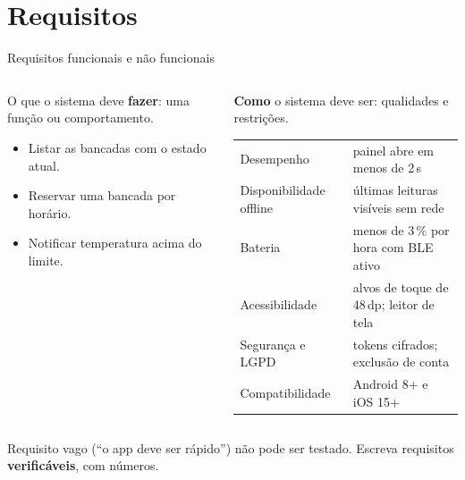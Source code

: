 \documentclass[aspectratio=169,10pt]{beamer}
\begin{document}
\section{Requisitos}

\begin{frame}{Requisitos funcionais e não funcionais}
  \begin{columns}[T]
    \begin{column}{0.48\textwidth}
      \begin{definicao}
        O que o sistema deve \textbf{fazer}: uma função ou comportamento.
      \end{definicao}
      \begin{exemplo}[No LabMonitor]
        \begin{itemize}
          \item Listar as bancadas com o estado atual.
          \item Reservar uma bancada por horário.
          \item Notificar temperatura acima do limite.
        \end{itemize}
      \end{exemplo}
    \end{column}
    \begin{column}{0.5\textwidth}
      \begin{definicao}
        \textbf{Como} o sistema deve ser: qualidades e restrições.
      \end{definicao}
      \scriptsize
      \begin{tabularx}{\linewidth}{@{}l L@{}}
        \toprule
         &  \\
        \midrule
        Desempenho & painel abre em menos de 2\,s \\
        Disponibilidade offline & últimas leituras visíveis sem rede \\
        Bateria & menos de 3\,\% por hora com BLE ativo \\
        Acessibilidade & alvos de toque de 48\,dp; leitor de tela \\
        Segurança e LGPD & tokens cifrados; exclusão de conta \\
        Compatibilidade & Android 8+ e iOS 15+ \\
        \bottomrule
      \end{tabularx}
    \end{column}
  \end{columns}
  \begin{atencao}
    Requisito vago (``o app deve ser rápido'') não pode ser testado. Escreva requisitos \textbf{verificáveis}, com números.
  \end{atencao}
\end{frame}
\end{document}
